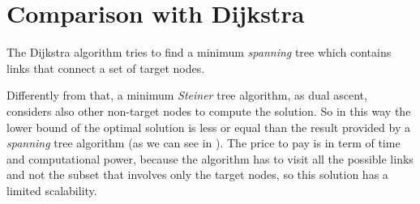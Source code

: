 \section{Comparison with Dijkstra}\label{sec:comparison}

The Dijkstra algorithm tries to find a minimum \emph{spanning} tree which
contains links that connect a set of target nodes.

Differently from that, a minimum \emph{Steiner} tree algorithm, as dual ascent,
considers also other non-target nodes to compute the solution. So in this way
the lower bound of the optimal solution is less or equal than the result
provided by a \emph{spanning} tree algorithm (as we can see in
). The price to pay is in term of time and computational
power, because the algorithm has to visit all the possible links and not the
subset that involves only the target nodes, so this solution has a limited
scalability.

